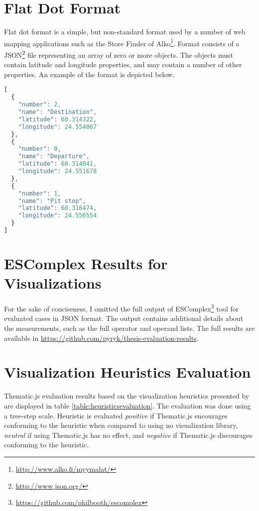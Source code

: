 
\chapter{Flat Dot Format}
\label{appendix:flatdotformat}

Flat dot format is a simple, but non-standard format used by a number of web mapping applications such as the Store Finder of Alko\footnote{\url{http://www.alko.fi/myymalat/}}. Format consists of a JSON\footnote{\url{http://www.json.org/}} file representing an array of zero or more objects. The objects must contain latitude and longitude properties, and may contain a number of other properties. An example of the format is depicted below.

\begin{lstlisting}[language=JavaScript]
[
  {
    "number": 2,
    "name": "Destination",
    "latitude": 60.314322,
    "longitude": 24.554067
  },
  {
    "number": 0,
    "name": "Departure",
    "latitude": 60.314041,
    "longitude": 24.551678
  },
  {
    "number": 1,
    "name": "Pit stop",
    "latitude": 60.316474,
    "longitude": 24.556554
  }
]
\end{lstlisting}

\chapter{ESComplex Results for Visualizations}
\label{appendix:escomplex}

For the sake of conciseness, I omitted the full output of ESComplex\footnote{\url{https://github.com/philbooth/escomplex}} tool for evaluated cases in JSON format. The output contains additional details about the measurements, such as the full operator and operand lists. The full results are available in \url{https://github.com/pyryk/thesis-evaluation-results}.

\chapter{Visualization Heuristics Evaluation}
\label{appendix:heuristicsevaluation}

Thematic.js evaluation results based on the visualization heuristics presented by \citet{zuk_heuristics_2006} are displayed in table \ref{table:heuristicsevaluation}. The evaluation was done using a tree-step scale. Heuristic is evaluated \emph{positive} if Thematic.js encourages conforming to the heuristic when compared to using no visualization library, \emph{neutral} if using Thematic.js has no effect, and \emph{negative} if Thematic.js discourages conforming to the heuristic.

